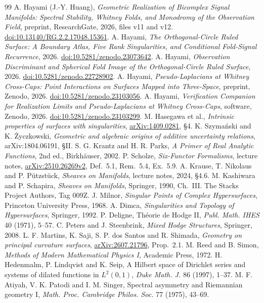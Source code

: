 \documentclass[11pt]{article}
\theoremstyle{definition}\newtheorem{definition}[theorem]{Definition}
\theoremstyle{remark}\newtheorem{remark}[theorem]{Remark}
\begin{document}
{\small
\begin{thebibliography}{99}
 A. Hayami (J.-Y. Huang), \emph{Geometric Realization of Bicomplex
Signal Manifolds: Spectral Stability, Whitney Folds, and Monodromy of the
Observation Field}, preprint, ResearchGate, 2026, files v11 and v12.
\href{https://doi.org/10.13140/RG.2.2.17048.15361}{doi:10.13140/RG.2.2.17048.15361}.
 A. Hayami, \emph{The Orthogonal-Circle Ruled Surface: A Boundary
Atlas, Five Rank Singularities, and Conditional Fold-Signal Recurrence}, 2026.
\href{https://doi.org/10.5281/zenodo.23073642}{doi:10.5281/zenodo.23073642}.
 A. Hayami, \emph{Observation Discriminant and Spherical Fold Image
of the Orthogonal-Circle Ruled Surface}, 2026.
\href{https://doi.org/10.5281/zenodo.22728902}{doi:10.5281/zenodo.22728902}.
 A. Hayami, \emph{Pseudo-Laplacians at Whitney Cross-Caps:
Point Interactions on Surfaces Mapped into Three-Space}, preprint, Zenodo, 2026.
\href{https://doi.org/10.5281/zenodo.23103056}{doi:10.5281/zenodo.23103056}.
 A. Hayami, \emph{Verification Companion for Realization Limits and
Pseudo-Laplacians at Whitney Cross-Caps}, software, Zenodo, 2026.
\href{https://doi.org/10.5281/zenodo.23103299}{doi:10.5281/zenodo.23103299}.
 M. Hasegawa et al., \emph{Intrinsic properties of surfaces
with singularities}, \href{https://arxiv.org/abs/1409.0281}{arXiv:1409.0281}, \S4.
 K. Szyma\'nski and K. \.Zyczkowski, \emph{Geometric and algebraic
origins of additive uncertainty relations}, arXiv:1804.06191, \S II.
 S. G. Krantz and H. R. Parks, \emph{A Primer of Real
Analytic Functions}, 2nd ed., Birkh\"auser, 2002.
 P. Scholze, \emph{Six-Functor Formalisms}, lecture notes,
\href{https://arxiv.org/abs/2510.26269}{arXiv:2510.26269v2}, Def.~5.1, Rem.~5.4, Ex.~5.9.
 A. Krause, T. Nikolaus and P. P\"utzst\"uck, \emph{Sheaves on
Manifolds}, lecture notes, 2024, \S4.6.
 M. Kashiwara and P. Schapira, \emph{Sheaves on Manifolds},
Springer, 1990, Ch.~III.
 The Stacks Project Authors, Tag 009Z.
 J. Milnor, \emph{Singular Points of Complex Hypersurfaces},
Princeton University Press, 1968.
 A. Dimca, \emph{Singularities and Topology of Hypersurfaces},
Springer, 1992.
 P. Deligne, Th\'eorie de Hodge II, \emph{Publ. Math. IHES}
40 (1971), 5--57.
 C. Peters and J. Steenbrink, \emph{Mixed Hodge Structures},
Springer, 2008.
 L. F. Martins, K. Saji, S. P. dos Santos and R. Shimada,
\emph{Geometry on principal curvature surfaces},
\href{https://arxiv.org/abs/2607.21796}{arXiv:2607.21796}, Prop.~2.1.
 M. Reed and B. Simon, \emph{Methods of Modern Mathematical
Physics I}, Academic Press, 1972.
 H. Hedenmalm, P. Lindqvist and K. Seip, A Hilbert space of
Dirichlet series and systems of dilated functions in $L^2(0,1)$,
\emph{Duke Math. J.} 86 (1997), 1--37.
 M. F. Atiyah, V. K. Patodi and I. M. Singer, Spectral asymmetry
and Riemannian geometry I, \emph{Math. Proc. Cambridge Philos. Soc.} 77 (1975), 43--69.
\end{thebibliography}}
\end{document}

